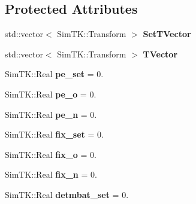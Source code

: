 \subsection*{Protected Attributes}
\begin{DoxyCompactItemize}
\item 
std\+::vector$<$ Sim\+T\+K\+::\+Transform $>$ {\bfseries Set\+T\+Vector}\hypertarget{classMonteCarloSampler_a4c863be2e5ebefe4e923caf007c7fde9}{}\label{classMonteCarloSampler_a4c863be2e5ebefe4e923caf007c7fde9}

\item 
std\+::vector$<$ Sim\+T\+K\+::\+Transform $>$ {\bfseries T\+Vector}\hypertarget{classMonteCarloSampler_af5fea1471133f61f5f5f05ab302f4562}{}\label{classMonteCarloSampler_af5fea1471133f61f5f5f05ab302f4562}

\item 
Sim\+T\+K\+::\+Real {\bfseries pe\+\_\+set} = 0.\hypertarget{classMonteCarloSampler_a08775705779aed062ed86216b538f03b}{}\label{classMonteCarloSampler_a08775705779aed062ed86216b538f03b}

\item 
Sim\+T\+K\+::\+Real {\bfseries pe\+\_\+o} = 0.\hypertarget{classMonteCarloSampler_a07f4e95e16aa27c6fd424d900c45e94d}{}\label{classMonteCarloSampler_a07f4e95e16aa27c6fd424d900c45e94d}

\item 
Sim\+T\+K\+::\+Real {\bfseries pe\+\_\+n} = 0.\hypertarget{classMonteCarloSampler_a7c5b417b17d79468129b03fe5398c482}{}\label{classMonteCarloSampler_a7c5b417b17d79468129b03fe5398c482}

\item 
Sim\+T\+K\+::\+Real {\bfseries fix\+\_\+set} = 0.\hypertarget{classMonteCarloSampler_a9f27d9e958e6911fa3b8fb13cb1d2481}{}\label{classMonteCarloSampler_a9f27d9e958e6911fa3b8fb13cb1d2481}

\item 
Sim\+T\+K\+::\+Real {\bfseries fix\+\_\+o} = 0.\hypertarget{classMonteCarloSampler_ae6919d5694b0417b337f768d3a62aded}{}\label{classMonteCarloSampler_ae6919d5694b0417b337f768d3a62aded}

\item 
Sim\+T\+K\+::\+Real {\bfseries fix\+\_\+n} = 0.\hypertarget{classMonteCarloSampler_a672a0893caefef6136ed20e125f47275}{}\label{classMonteCarloSampler_a672a0893caefef6136ed20e125f47275}

\item 
Sim\+T\+K\+::\+Real {\bfseries detmbat\+\_\+set} = 0.\hypertarget{classMonteCarloSampler_a258169bc588eb202b488a7a7941c446e}{}\label{classMonteCarloSampler_a258169bc588eb202b488a7a7941c446e}


\end{DoxyCompactItemize}
